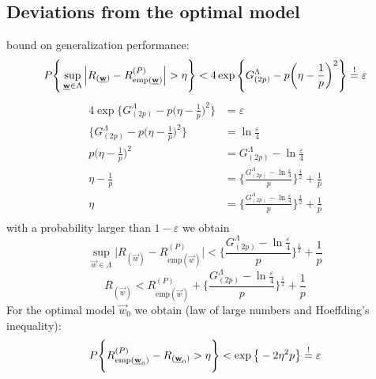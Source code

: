 \subsection{Deviations from the optimal model}
bound on generalization performance:
\begin{equation}
	P\Bigg\{ \sup_{\underline{\mathbf{w}} \in \Lambda} 
	\Big| R_{ ( \underline{\mathbf{w}} ) } -
		R_{ \mathrm{ emp } ( \underline{\mathbf{w}} ) }^{ (P) }
	\Big| > \eta \Bigg\}
	< 4\exp\Bigg\{ G_{ (2p) }^\Lambda - p \bigg( \eta - \frac{1}{p} \bigg)^2
		\Bigg\} \stackrel{\mathrm{!}}{=} \varepsilon
\end{equation}
\begin{equation}
	\begin{array}{rl}
	4\exp\Bigg\{ G_{ (2p) }^\Lambda - p \bigg( \eta - \frac{1}{p} \bigg)^2
		\Bigg\} & = \varepsilon \\
	\Bigg\{ G_{ (2p) }^\Lambda - p \bigg( \eta - \frac{1}{p} \bigg)^2
		\Bigg\} & = \ln \frac{\varepsilon}{4} \\
	p \bigg( \eta - \frac{1}{p} \bigg)^2
		& = G_{ (2p) }^\Lambda -\ln \frac{\varepsilon}{4} \\
	\eta - \frac{1}{p}
		& = \Bigg\{ \frac{ G_{ (2p) }^\Lambda 
			-\ln \frac{\varepsilon}{4} }{p}
		\Bigg\}^{ \frac{1}{2} } + \frac{1}{p} \\
	\eta & = \Bigg\{ \frac{ G_{ (2p) }^\Lambda 
			-\ln \frac{\varepsilon}{4} }{p}
		\Bigg\}^{ \frac{1}{2} } + \frac{1}{p} \\
	\end{array}
\end{equation}
with a probability larger than $1 - \varepsilon$ we obtain
\begin{equation}
	\sup_{\vec{w} \in \Lambda} 
		\Big| R_{ ( \vec{w} ) } -
		R_{ \mathrm{ emp } ( \vec{w} ) }^{ (P) }
		\Big|
	< \Bigg\{ \frac{ G_{ (2p) }^\Lambda 
			-\ln \frac{\varepsilon}{4} }{p}
		\Bigg\}^{ \frac{1}{2} } + \frac{1}{p}
\end{equation}
\begin{equation} \label{main1}
	R_{ ( \vec{w} ) } <
	R_{ \mathrm{ emp } ( \vec{w} ) }^{ (P) } +
	\Bigg\{ \frac{ G_{ (2p) }^\Lambda 
			-\ln \frac{\varepsilon}{4} }{p}
		\Bigg\}^{ \frac{1}{2} } + \frac{1}{p}
\end{equation}
For the optimal model $\vec{w}_0$ we obtain (law of large numbers and Hoeffding's inequality):
\begin{equation}
	P\Bigg\{
	R_{ \mathrm{ emp } ( \underline{\mathbf{w}}_0 ) }^{ (P) } -
	R_{ ( \underline{\mathbf{w}}_0 ) } > \eta
	\Bigg\}
	< \exp\big\{ -2 \eta^2 p \big\} \stackrel{\mathrm{!}}{=} \varepsilon
\end{equation}

